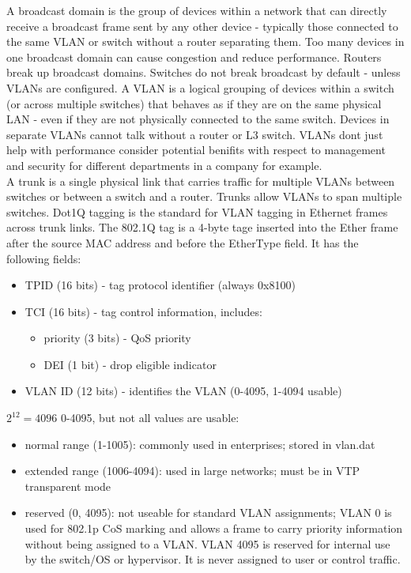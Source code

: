 \documentclass[parindent=0pt]{article}
\begin{document}
A broadcast domain is the group of devices within a network that can directly receive a broadcast frame sent by any other device - typically those connected to the same VLAN or switch without a router separating them. Too many devices in one broadcast domain can cause congestion and reduce performance. Routers break up broadcast domains. Switches do not break broadcast by default - unless VLANs are configured. A VLAN is a logical grouping of devices within a switch (or across multiple switches) that behaves as if they are on the same physical LAN - even if they are not physically connected to the same switch. Devices in separate VLANs cannot talk without a router or L3 switch. VLANs dont just help with performance consider potential benifits with respect to management and security for different departments in a company for example.\\

A trunk is a single physical link that carries traffic for multiple VLANs between switches or between a switch and a router. Trunks allow VLANs to span multiple switches. Dot1Q tagging is the standard for VLAN tagging in Ethernet frames across trunk links. The 802.1Q tag is a 4-byte tage inserted into the Ether frame after the source MAC address and before the EtherType field. It has the following fields: 
	\begin{itemize}	
		\item TPID (16 bits) - tag protocol identifier (always 0x8100)
		\item TCI (16 bits) - tag control information, includes:
			\begin{itemize}
				\item priority (3 bits) - QoS priority
				\item DEI (1 bit) - drop eligible indicator
			\end{itemize}
		\item VLAN ID (12 bits) - identifies the VLAN (0-4095, 1-4094 usable)
	\end{itemize}

$2^12 = 4096$ 0-4095, but not all values are usable:
	\begin{itemize}
		\item normal range (1-1005): commonly used in enterprises; stored in vlan.dat
		\item extended range (1006-4094): used in large networks; must be in VTP transparent mode
		\item reserved (0, 4095): not useable for standard VLAN assignments; VLAN 0 is used for 802.1p CoS marking and allows a frame to carry priority information without being assigned to a VLAN. VLAN 4095 is reserved for internal use by the switch/OS or hypervisor. It is never assigned to user or control traffic.
	\end{itemize}
\end{document}
